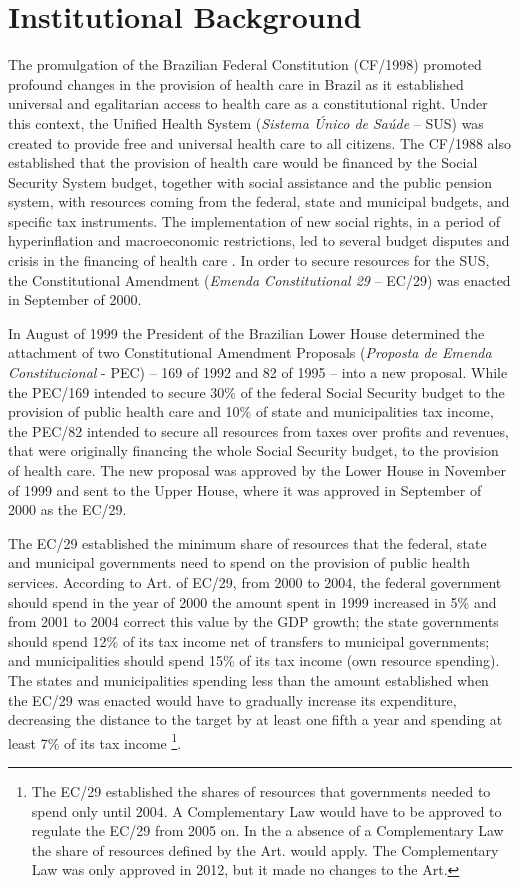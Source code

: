 \section{Institutional Background}\label{sec:inst}

The promulgation of the \citeyear{constituicao} Brazilian Federal Constitution (CF/1998) promoted profound changes in the provision of health care in Brazil as it established universal and egalitarian access to health care as a constitutional right. Under this context, the Unified Health System (\emph{Sistema Único de Saúde} -- SUS) was created to provide free and universal health care to all citizens. The CF/1988 also established that the provision of health care would be financed by the Social Security System budget, together with social assistance and the public pension system, with resources coming from the federal, state and municipal budgets, and specific tax instruments. The implementation of new social rights, in a period of hyperinflation and macroeconomic restrictions, led to several budget disputes and crisis in the financing of health care \citep{Piola2013}. In order to secure resources for the SUS, the  Constitutional Amendment (\emph{Emenda Constitutional 29} -- EC/29) was enacted in September of 2000.

In August of 1999 the President of the Brazilian Lower House determined the attachment of two Constitutional Amendment Proposals (\emph{Proposta de Emenda Constitucional} - PEC) -- 169 of 1992 and 82 of 1995 -- into a new proposal. While the PEC/169 intended to secure 30\% of the federal Social Security budget to the provision of public health care and 10\% of state and municipalities tax income, the PEC/82 intended to secure all resources from taxes over profits and revenues, that were originally financing the whole Social Security budget, to the provision of health care. The new proposal was approved by the Lower House in November of 1999 and sent to the Upper House, where it was approved in September of 2000 as the EC/29.

The EC/29 established the minimum share of resources that the federal, state and municipal governments need to spend on the provision of public health services. According to Art.  of EC/29, from 2000 to 2004, the federal government should spend in the year of 2000 the amount spent in 1999 increased in 5\% and from 2001 to 2004 correct this value by the GDP growth; the state governments should spend 12\% of its tax income net of transfers to municipal governments; and municipalities should spend 15\% of its tax income (own resource spending). The states and municipalities spending less than the amount established when the EC/29 was enacted would have to gradually increase its expenditure, decreasing the distance to the target by at least one fifth a year and spending at least 7\% of its tax income \footnote{The EC/29 established the shares of resources that governments needed to spend only until 2004. A Complementary Law would have to be approved to regulate the EC/29 from 2005 on. In the a absence of a Complementary Law the share of resources defined by the Art.  would apply. The Complementary Law was only approved in 2012, but it made no changes to the Art. }. 

